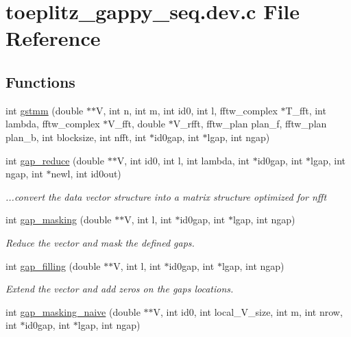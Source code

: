 \section{toeplitz\-\_\-gappy\-\_\-seq.\-dev.\-c File Reference}
\label{toeplitz__gappy__seq_8dev_8c}
\subsection*{Functions}
\begin{DoxyCompactItemize}
\item 
int \hyperlink{toeplitz__gappy__seq_8dev_8c_af66e44de454002389ec9a52953526a59}{gstmm} (double $\ast$$\ast$V, int n, int m, int id0, int l, fftw\-\_\-complex $\ast$T\-\_\-fft, int lambda, fftw\-\_\-complex $\ast$V\-\_\-fft, double $\ast$V\-\_\-rfft, fftw\-\_\-plan plan\-\_\-f, fftw\-\_\-plan plan\-\_\-b, int blocksize, int nfft, int $\ast$id0gap, int $\ast$lgap, int ngap)
\item 
int \hyperlink{toeplitz__gappy__seq_8dev_8c_a8c05d2ff1d358740d1c8965040e7080a}{gap\-\_\-reduce} (double $\ast$$\ast$V, int id0, int l, int lambda, int $\ast$id0gap, int $\ast$lgap, int ngap, int $\ast$newl, int id0out)
\begin{DoxyCompactList}\small\item\em ...convert the data vector structure into a matrix structure optimized for nfft \end{DoxyCompactList}\item 
int \hyperlink{toeplitz__gappy__seq_8dev_8c_a8a16933581102fbad56d8ef6610eac81}{gap\-\_\-masking} (double $\ast$$\ast$V, int l, int $\ast$id0gap, int $\ast$lgap, int ngap)
\begin{DoxyCompactList}\small\item\em Reduce the vector and mask the defined gaps. \end{DoxyCompactList}\item 
int \hyperlink{toeplitz__gappy__seq_8dev_8c_af84a476c33acadd1dbfa6e9833e16499}{gap\-\_\-filling} (double $\ast$$\ast$V, int l, int $\ast$id0gap, int $\ast$lgap, int ngap)
\begin{DoxyCompactList}\small\item\em Extend the vector and add zeros on the gaps locations. \end{DoxyCompactList}\item 
int \hyperlink{toeplitz__gappy__seq_8dev_8c_a9fff288f9a34ed29e0a344a1e238a973}{gap\-\_\-masking\-\_\-naive} (double $\ast$$\ast$V, int id0, int local\-\_\-\-V\-\_\-size, int m, int nrow, int $\ast$id0gap, int $\ast$lgap, int ngap)
\end{DoxyCompactItemize}


